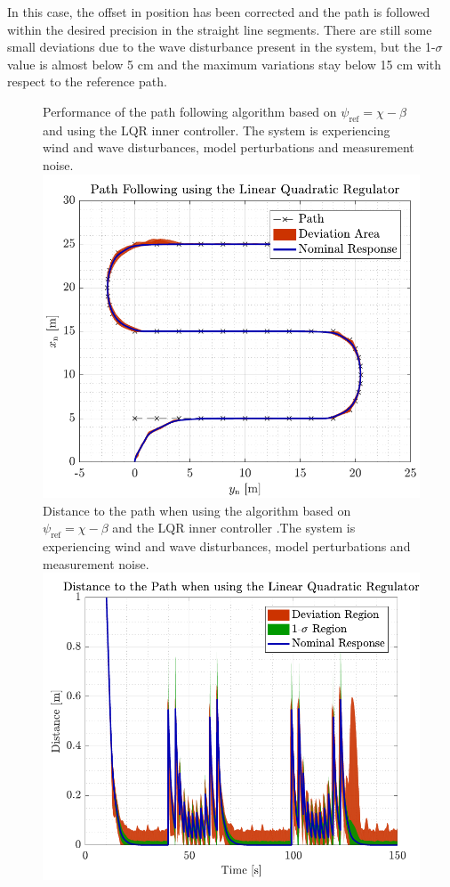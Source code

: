 In this case, the offset in position has been corrected and the path is followed within the desired precision in the straight line segments. There are still some small deviations due to the wave disturbance present in the system, but the 1-$\sigma$ value is almost below 5 cm and the maximum variations stay below 15 cm with respect to the reference path.
\begin{figure}[H]
	\captionbox  %
	{               %
		Performance of the path following algorithm based on $\psi_\mathrm{ref}=\chi-\beta$ and using the LQR inner controller. The system is experiencing wind and wave disturbances, model perturbations and measurement noise.                %
		\label{fig:lrqcorrect}                                  %
	}                                                                 %
	{                                                                  %
		\includegraphics[width=.45\textwidth]{figures/path_lqr}         %
	}                                                                    %
	\hspace{5pt}                                                          %
	\captionbox  %
	{       
			Distance to the path when using the algorithm based on $\psi_\mathrm{ref}=\chi-\beta$ and the LQR inner controller .The system is experiencing wind and wave disturbances, model perturbations and measurement noise.                                                                  %
		\label{fig:distlqr}                                     %
	}                                                                           %
	{                                                                            %
		\includegraphics[width=.45\textwidth]{figures/dist_lqr}            %
	}                                                                             %
\end{figure}
